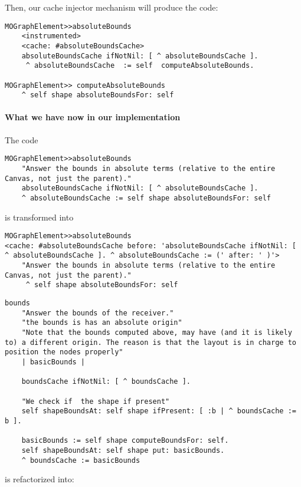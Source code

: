 \documentclass[runningheads]{llncs}
\begin{document}
Then, our cache injector mechanism will produce the code:
\begin{lstlisting}
MOGraphElement>>absoluteBounds
	<instrumented>
	<cache: #absoluteBoundsCache>
	absoluteBoundsCache ifNotNil: [ ^ absoluteBoundsCache ].
	 ^ absoluteBoundsCache  := self  computeAbsoluteBounds.
	
MOGraphElement>> computeAbsoluteBounds
	^ self shape absoluteBoundsFor: self
\end{lstlisting}



\paragraph{What we have now in our implementation}

The code
\begin{lstlisting}
MOGraphElement>>absoluteBounds
	"Answer the bounds in absolute terms (relative to the entire Canvas, not just the parent)."
	absoluteBoundsCache ifNotNil: [ ^ absoluteBoundsCache ].
	^ absoluteBoundsCache := self shape absoluteBoundsFor: self
\end{lstlisting}

is transformed into 

\begin{lstlisting}
MOGraphElement>>absoluteBounds
<cache: #absoluteBoundsCache before: 'absoluteBoundsCache ifNotNil: [ ^ absoluteBoundsCache ]. ^ absoluteBoundsCache := (' after: ' )'>
	"Answer the bounds in absolute terms (relative to the entire Canvas, not just the parent)."
	 ^ self shape absoluteBoundsFor: self
\end{lstlisting}

\begin{lstlisting}
bounds
	"Answer the bounds of the receiver."
	"the bounds is has an absolute origin"
	"Note that the bounds computed above, may have (and it is likely to) a different origin. The reason is that the layout is in charge to position the nodes properly"
	| basicBounds |

	boundsCache ifNotNil: [ ^ boundsCache ].

	"We check if  the shape if present"
	self shapeBoundsAt: self shape ifPresent: [ :b | ^ boundsCache := b ].

	basicBounds := self shape computeBoundsFor: self.
	self shapeBoundsAt: self shape put: basicBounds.
	^ boundsCache := basicBounds
\end{lstlisting}

is refactorized into:
\end{document}
